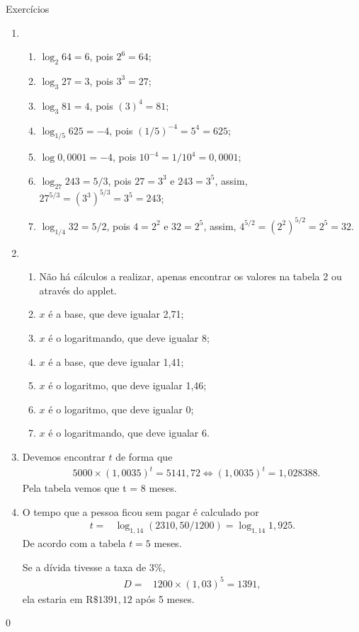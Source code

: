 \begin{answer}{Exercícios}
{
	\begin{enumerate}
	\item
		\begin{enumerate}
		\item $\log_2 64 = 6$, pois $2^6 = 64$;
		\item $\log_{3} 27 = 3$, pois $3^{3} = 27$;
		\item $\log_{3} 81 = 4$, pois $(3)^{4} = 81$;
		\item $\log_{1/5} 625 = -4$, pois $(1/5)^{-4} =  5^4 = 625$;
		\item $\log 0,0001 = -4$, pois $10^{-4} =1/10^4 = 0,0001 $;
		\item $\log_{27} 243 = 5/3$, pois $27=3^3$ e $243 = 3^5$, assim, $27^{5/3} =(3^3)^{5/3}= 3^5 = 243$;
		\item $\log_{1/4} 32 = 5/2$, pois $4=2^2$ e $32 = 2^5$, assim, $4^{5/2} =(2^2)^{5/2}= 2^5 = 32$.
		\end{enumerate}

	\item 
		\begin{enumerate}
		\item[] Não há cálculos a realizar, apenas encontrar os valores na tabela 2 ou através do applet. 
		\item $x$ é a base, que deve igualar 2,71;
		\item $x$ é o logaritmando, que deve igualar 8;
		\item $x$ é a base, que deve igualar 1,41;
		\item $x$ é o logaritmo, que deve igualar 1,46;
		\item $x$ é o logaritmo, que deve igualar 0;
		\item $x$ é o logaritmando, que deve igualar 6.
		\end{enumerate}
	
    \item
    Devemos encontrar $t$ de forma que
    \begin{align*}
    & 5000 \times (1,0035)^t = 5141,72
    \Leftrightarrow (1,0035)^t = 1,028388.
    \end{align*}
    Pela tabela vemos que t = 8 meses.

    \item 
    O tempo que a pessoa ficou sem pagar é calculado por
    \begin{align*}
    t =& \log_{1{,}14} (2310{,}50/1200)= \log_{1{,}14} 1{,}925.
    \end{align*}
    De acordo com a tabela $t = 5$ meses.

    Se a dívida tivesse a taxa de 3$\%$,
    \begin{align*}
    D =& 1200 \times (1,03)^5= 1391,
    \end{align*}
    ela estaria em R$\$1391{,}12$ após 5 meses.
	\end{enumerate}
}{0}
\end{answer}
